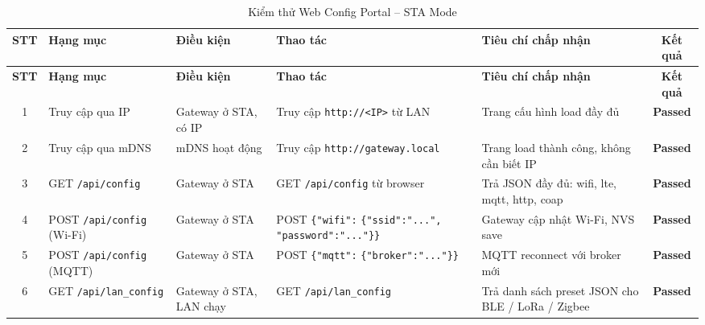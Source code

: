         \begin{longtable}{|c|p{3cm}|p{2cm}|p{4cm}|p{3cm}|c|}
            \caption{Kiểm thử Web Config Portal -- STA Mode}
            \label{tab:test_web_config_sta} \\
            \hline
            \textbf{STT} & \textbf{Hạng mục} & \textbf{Điều kiện} & \textbf{Thao tác} & \textbf{Tiêu chí chấp nhận} & \textbf{Kết quả} \\ \hline
            \endfirsthead
            \hline
            \textbf{STT} & \textbf{Hạng mục} & \textbf{Điều kiện} & \textbf{Thao tác} & \textbf{Tiêu chí chấp nhận} & \textbf{Kết quả} \\ \hline
            \endhead
            \hline
            \endfoot
            \endlastfoot
        
            1 & Truy cập qua IP & Gateway ở STA, có IP & Truy cập \texttt{http://<IP>} từ LAN & Trang cấu hình load đầy đủ & \textcolor{modern_blue}{\textbf{Passed}} \\ \hline
        
            2 & Truy cập qua mDNS & mDNS hoạt động & Truy cập \texttt{http://}\newline\texttt{gateway.local} & Trang load thành công, không cần biết IP & \textcolor{modern_blue}{\textbf{Passed}} \\ \hline
        
            3 & GET \texttt{/api/config} & Gateway ở STA & GET \texttt{/api/config} từ browser & Trả JSON đầy đủ: wifi, lte, mqtt, http, coap & \textcolor{modern_blue}{\textbf{Passed}} \\ \hline
        
            4 & POST \texttt{/api/config} (Wi-Fi) & Gateway ở STA & POST \newline\texttt{\{"wifi":} \newline\texttt{\{"ssid":"...",} \newline\texttt{"password":"..."\}\}} & Gateway cập nhật Wi-Fi, NVS save & \textcolor{modern_blue}{\textbf{Passed}} \\ \hline
        
            5 & POST \texttt{/api/config} (MQTT) & Gateway ở STA & POST \newline\texttt{\{"mqtt":} \newline\texttt{\{"broker":"..."\}\}} & MQTT reconnect với broker mới & \textcolor{modern_blue}{\textbf{Passed}} \\ \hline
        
            6 & GET \texttt{/api/lan\_config} & Gateway ở STA, LAN chạy & GET \newline\texttt{/api/lan\_config} & Trả danh sách preset JSON cho BLE / LoRa / Zigbee & \textcolor{modern_blue}{\textbf{Passed}} \\ \hline
        

\end{longtable}
